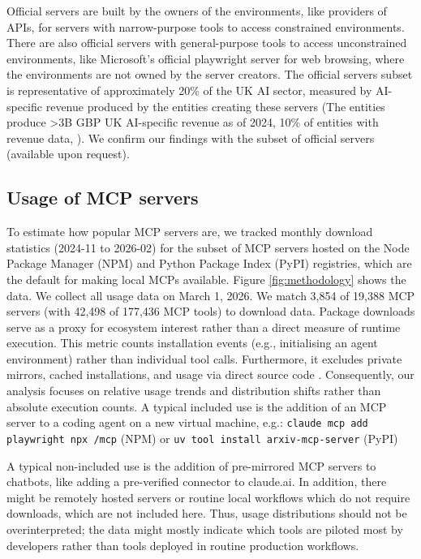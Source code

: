 \documentclass[manuscript,screen,nonacm,oneside]{acmart}
\begin{document}
Official servers are built by the owners of the environments, like providers of APIs, for servers with narrow-purpose tools to access constrained environments. There are also official servers with general-purpose tools to access unconstrained environments, like Microsoft's official playwright server for web browsing, where the environments are not owned by the server creators. The official servers subset is representative of approximately 20\% of the UK AI sector, measured by AI-specific revenue produced by the entities creating these servers (The entities produce \textgreater3B GBP UK AI-specific revenue as of 2024, 10\% of entities with revenue data, \citep{undefinedArtificialIntelligence}). We confirm our findings with the subset of official servers (available upon request).

\subsection{Usage of MCP servers}
\label{sec:usage-mcp}

To estimate how popular MCP servers are, we tracked monthly download statistics (2024-11 to 2026-02) for the subset of MCP servers hosted on the Node Package Manager (NPM) and Python Package Index (PyPI) registries, which are the default for making local MCPs available. Figure \ref{fig:methodology} shows the data. We collect all usage data on March 1, 2026. We match 3,854 of 19,388 MCP servers (with 42,498 of 177,436 MCP tools) to download data. Package downloads serve as a proxy for ecosystem interest rather than a direct measure of runtime execution. This metric counts installation events (e.g., initialising an agent environment) rather than individual tool calls. Furthermore, it excludes private mirrors, cached installations, and usage via direct source code \citep{npmjsBlogArchive}. Consequently, our analysis focuses on relative usage trends and distribution shifts rather than absolute execution counts. A typical included use is the addition of an MCP server to a coding agent on a new virtual machine, e.g.: \texttt{claude mcp add playwright npx \textquotesingle\@playwright/mcp\@latest\textquotesingle{}} (NPM) or \texttt{uv tool install arxiv-mcp-server} (PyPI)

A typical non-included use is the addition of pre-mirrored MCP servers to chatbots, like adding a pre-verified connector to claude.ai. In addition, there might be remotely hosted servers or routine local workflows which do not require downloads, which are not included here. Thus, usage distributions should not be overinterpreted; the data might mostly indicate which tools are piloted most by developers rather than tools deployed in routine production workflows.
\end{document}
